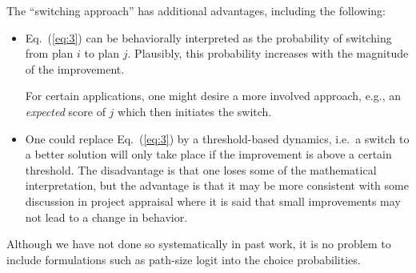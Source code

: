The ``switching approach'' has additional advantages, including the
following:
\begin{itemize}

\item Eq.~(\ref{eq:3}) can be behaviorally interpreted as the
  probability of switching from plan $i$ to plan $j$.  Plausibly, this
  probability increases with the magnitude of the improvement.  

  For certain applications, one might desire a more involved approach,
  e.g., an \emph{expected} score of $j$ which then initiates the
  switch.

\item One could replace Eq.~(\ref{eq:3}) by a threshold-based
  dynamics, i.e.\ a switch to a better solution will only take place
  if the improvement is above a certain threshold.  The disadvantage
  is that one loses some of the mathematical interpretation, but the
  advantage is that it may be more consistent with some discussion in
  project appraisal where it is said that small improvements may not
  lead to a change in behavior.


\end{itemize}

Although we have not done so systematically in past work, it is no
problem to include formulations such as path-size logit 
\citep{ben-akiva-1999} into the choice probabilities.


